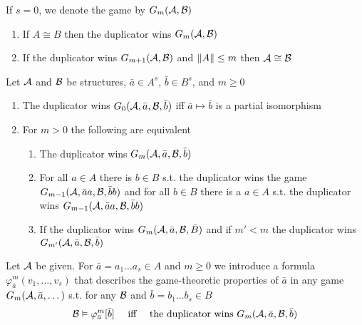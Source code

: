 \documentclass[11pt]{article}
\begin{document}
If \(s=0\), we denote the game by \(G_m(\mathcal{A},\mathcal{B})\)

\begin{lemma}[]
\begin{enumerate}
\item If \(A\cong B\) then the duplicator wins \(G_m(\mathcal{A},\mathcal{B})\)
\item If the duplicator wins \(G_{m+1}(\mathcal{A},\mathcal{B})\) and \(\left\lVert A\right\rVert\le m\) then \(\mathcal{A}\cong\mathcal{B}\)
\end{enumerate}
\end{lemma}

\begin{lemma}[]
Let \(\mathcal{A}\) and \(\mathcal{B}\) be structures, \(\bar{a}\in A^s\), \(\bar{b}\in B^s\), and \(m\ge0\)
\begin{enumerate}
\item The duplicator wins \(G_0(\mathcal{A},\bar{a},\mathcal{B},\bar{b})\) iff \(\bar{a}\mapsto\bar{b}\) is a
partial isomorphism
\item For \(m>0\) the following are equivalent
\begin{enumerate}
\item The duplicator wins \(G_m(\mathcal{A},\bar{a},\mathcal{B},\bar{b})\)
\item For all \(a\in A\) there is \(b\in B\) s.t. the duplicator wins the
game \(G_{m-1}(\mathcal{A},\bar{a}a,\mathcal{B},\bar{b}b)\) and for all \(b\in B\) there is
a \(a\in A\) s.t. the duplicator wins \(G_{m-1}(\mathcal{A},\bar{a}a,\mathcal{B},\bar{b}b)\)
\item If the duplicator wins \(G_m(\mathcal{A},\bar{a},\mathcal{B},\bar{B})\) and if \(m'<m\) the duplicator
wins \(G_{m'}(\mathcal{A},\bar{a},\mathcal{B},\bar{b})\)
\end{enumerate}
\end{enumerate}
\end{lemma}

Let \(\mathcal{A}\) be given. For \(\bar{a}=a_1\dots a_s\in A\) and \(m\ge0\) we introduce a formula
\(\varphi^m_{\bar{a}}(v_1,\dots,v_s)\) that describes the game-theoretic properties
of \(\bar{a}\) in any game \(G_m(\mathcal{A},\bar{a},\dots)\) s.t. for any \(\mathcal{B}\)
and \(\bar{b}=b_1\dots b_s\in B\)
\begin{equation*}
\mathcal{B}\vDash\varphi^m_{\bar{a}}[\bar{b}]
\quad\text{ iff }\quad
\text{the duplicator wins }G_m(\mathcal{A},\bar{a},\mathcal{B},\bar{b})
\end{equation*}
\end{document}
